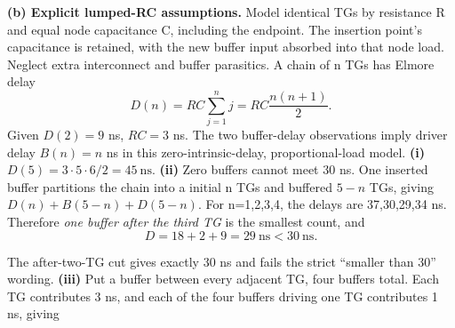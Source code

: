 \documentclass[10pt]{article}
\begin{document}
\textbf{(b) Explicit lumped-RC assumptions.} Model identical TGs by resistance R and equal node capacitance C, including the endpoint. The insertion point's capacitance is retained, with the new buffer input absorbed into that node load. Neglect extra interconnect and buffer parasitics. A chain of n TGs has Elmore delay
\[D(n)=RC\sum_{j=1}^n j=RC\frac{n(n+1)}2.\]
Given $D(2)=9$ ns, $RC=3$ ns. The two buffer-delay observations imply driver delay $B(n)=n$ ns in this zero-intrinsic-delay, proportional-load model.
\textbf{(i)} $D(5)=3\cdot5\cdot6/2=\boxed{45\ \mathrm{ns}}$.
\textbf{(ii)} Zero buffers cannot meet 30 ns. One inserted buffer partitions the chain into a initial n TGs and buffered $5-n$ TGs, giving $D(n)+B(5-n)+D(5-n)$. For n=1,2,3,4, the delays are 37,30,29,34 ns. Therefore \emph{one buffer after the third TG} is the smallest count, and
\[\boxed{D=18+2+9=29\ \mathrm{ns}<30\ \mathrm{ns}.}\]
\begin{center}\end{center}
The after-two-TG cut gives exactly 30 ns and fails the strict ``smaller than 30'' wording.
\textbf{(iii)} Put a buffer between every adjacent TG, four buffers total. Each TG contributes 3 ns, and each of the four buffers driving one TG contributes 1 ns, giving
\end{document}
